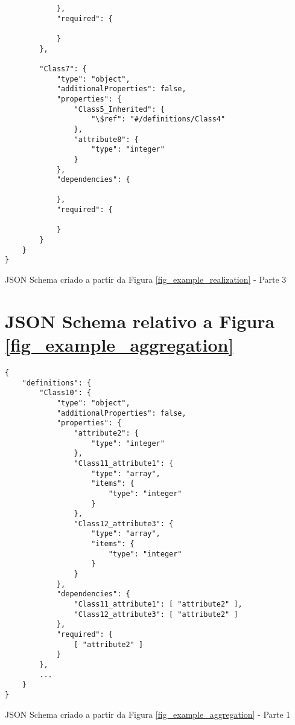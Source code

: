\begin{anexosenv}
\begin{listing}
\begin{verbatim}
            },
            "required": {
                
            }
        },
        
        "Class7": {
            "type": "object",
            "additionalProperties": false,
            "properties": {
                "Class5_Inherited": {
                    "\$ref": "#/definitions/Class4"
                },
                "attribute8": {
                    "type": "integer"
                }
            },
            "dependencies": {
            
            },
            "required": {
                
            }
        }
    }
}              
\end{verbatim}
\caption{JSON Schema criado a partir da Figura \ref{fig_example_realization} - Parte 3}
\end{listing}


\chapter{JSON Schema relativo a Figura \ref{fig_example_aggregation}}
\label{fig_example_aggregation_j}

\begin{listing}
\begin{verbatim}
{
    "definitions": {
        "Class10": {
            "type": "object",
            "additionalProperties": false,
            "properties": {
                "attribute2": {
                    "type": "integer"
                },
                "Class11_attribute1": {
                    "type": "array",
                    "items": {
                        "type": "integer"
                    }
                },
                "Class12_attribute3": {
                    "type": "array",
                    "items": {
                        "type": "integer"
                    }
                }
            },
            "dependencies": {
                "Class11_attribute1": [ "attribute2" ],
                "Class12_attribute3": [ "attribute2" ]
            },
            "required": {
                [ "attribute2" ]
            }
        },
        ...
    }
}
\end{verbatim}
\caption{JSON Schema criado a partir da Figura \ref{fig_example_aggregation} - Parte 1}
\end{listing}



\end{anexosenv}

